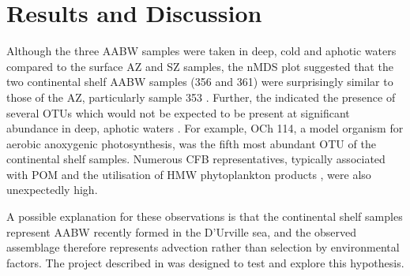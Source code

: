 \section{Results and Discussion}

Although the three \ac{AABW} samples were taken in deep, cold and aphotic waters  compared to the surface \ac{AZ} and \ac{SZ} samples, the \ac{nMDS} plot suggested that the two continental shelf \ac{AABW} samples (356 and 361) were surprisingly similar to those of the \ac{AZ}, particularly sample 353 .
Further, the indicated the presence of several \acp{OTU} which would not be expected to be present at significant abundance in deep, aphotic waters .
For example,  OCh 114, a model organism for aerobic anoxygenic photosynthesis, was the fifth most abundant \ac{OTU} of the continental shelf samples.
Numerous \ac{CFB} representatives, typically associated with \ac{POM} and the utilisation of \ac{HMW} phytoplankton products \citep[e.g.][]{Williams:2012gsa}, were also unexpectedly high.



A possible explanation for these observations is that the continental shelf samples represent \ac{AABW} recently formed in the D'Urville sea, and the observed assemblage therefore represents advection rather than selection by environmental factors.
The project described in  was designed to test and explore this hypothesis.


